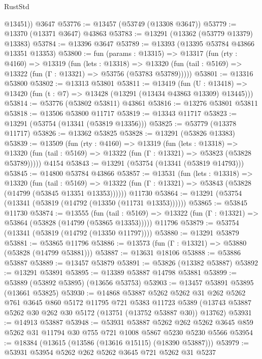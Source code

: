 \begin{lexlean}{RustStd}
\begin{coremodule}
        @13451))
    @3647
@53776 := @13457 (@53749 (@13308 @3647))
@53779 := @13370 (@13371 @3647) @43863
@53783 := @13291 (@13362 (@53779 @13379) @13383)
@53784 := @13396 @3647
@53789 := @13393 (@13395 @53784 @43866 @13351 @13353)
@53800 := fun (params : @13315) =>
  @13317
    (fun (rty : @4160) =>
    @13319
      (fun (lets : @13318) =>
      @13320 (fun (tail : @5169) => @13322 (fun (Γ : @13321) => @53756 (@53783 @53789)))))
@53801 := @13316 @53800
@53802 := @13313 @53801
@53811 := @13419
    (fun (U : @13418) => @13420 (fun (t : @7) => @13428 (@13291 (@13434 @43863 @13309) @13445)))
@53814 := @53776 (@53802 @53811) @43861
@53816 := @13276 @53801 @53811
@53818 := @13506 @53800 @11717
@53819 := @13343 @11717
@53823 := @13291 (@53754 (@13341 (@53819 @13356)))
@53825 := @53779 (@13378 @11717)
@53826 := @13362 @53825
@53828 := @13291 (@53826 @13383)
@53839 := @13509
    (fun (rty : @4160) =>
    @13319
      (fun (lets : @13318) =>
      @13320 (fun (tail : @5169) => @13322 (fun (Γ : @13321) => @53823 (@53828 @53789)))))
    @4154
@53843 := @13291 (@53754 (@13341 (@53819 @14793)))
@53845 := @14800 @53784 @43866
@53857 := @13531
    (fun (lets : @13318) =>
    @13320
      (fun (tail : @5169) =>
      @13322 (fun (Γ : @13321) => @53843 (@53828 (@14799 (@53845 @13351 @13353))))))
    @11730
@53864 := @13291 (@53754 (@13341 (@53819 (@14792 (@13350 (@11731 @13353))))))
@53865 := @53845 @11730
@53874 := @13555
    (fun (tail : @5169) => @13322 (fun (Γ : @13321) => @53864 (@53828 (@14799 (@53865 @13353)))))
    @11796
@53879 := @53754 (@13341 (@53819 (@14792 (@13350 @11797))))
@53880 := @13291 @53879
@53881 := @53865 @11796
@53886 := @13573 (fun (Γ : @13321) => @53880 (@53828 (@14799 @53881)))
@53887 := @13631 @18106
@53888 := @53886 @53887
@53889 := @13457 @53879
@53891 := @53826 (@13382 @53887)
@53892 := @13291 @53891
@53895 := @13389 @53887 @14798 @53881
@53899 := @53889 (@53892 @53895) (@13656 @53753)
@53903 := @13457 @53891 @53895 (@13661 @53825)
@53930 := @14868
    @53887
    @5262
    @5262
    @31
    @262
    @5262
    @761
    @3645
    @860
    @5172
    @11795
    @721
    @5383
    @11723
    @5389
    (@13743 @53887 @5262 @30 @262 @30 @5172 (@13751 (@13752 @53887 @30)) @13762)
@53931 := @14913 @53887
@53948 := @53931
    @53887
    @5262
    @262
    @5262
    @3645
    @859
    @5262
    @31
    @11794
    @30
    @755
    @721
    @1008
    @5867
    @5230
    @5230
    @5566
@53954 := @18384 (@13615 (@13586 (@13616 @15115) (@18390 @53887)))
@53979 := @53931
    @53954
    @5262
    @262
    @5262
    @3645
    @721
    @5262
    @31
    @5237

\end{coremodule}
\end{lexlean}
